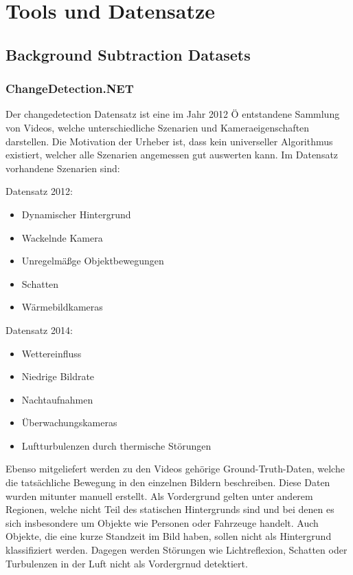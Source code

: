 \chapter{Tools und Datensatze}

\section{Background Subtraction Datasets}
\subsection*{ChangeDetection.NET}
Der changedetection Datensatz ist eine im Jahr 2012 Ö entstandene Sammlung von Videos, welche unterschiedliche Szenarien und Kameraeigenschaften darstellen. Die Motivation der Urheber ist, dass kein universeller Algorithmus existiert, welcher alle Szenarien angemessen gut auswerten kann. Im Datensatz vorhandene Szenarien sind:
\begin{multicols}{2}
Datensatz 2012:
\begin{itemize}
 \item Dynamischer Hintergrund
 \item Wackelnde Kamera
 \item Unregelm\"aßge Objektbewegungen
 \item Schatten
 \item W\"armebildkameras
\end{itemize}

\columnbreak

Datensatz 2014:
\begin{itemize}
 \item Wettereinfluss
 \item Niedrige Bildrate
 \item Nachtaufnahmen
 \item \"Uberwachungskameras
 \item Luftturbulenzen durch thermische St\"orungen
\end{itemize}
\end{multicols}

Ebenso mitgeliefert werden zu den Videos geh\"orige Ground-Truth-Daten, welche die tats\"achliche Bewegung in den einzelnen Bildern beschreiben. Diese Daten wurden mitunter manuell erstellt. Als Vordergrund gelten unter anderem Regionen, welche nicht Teil des statischen Hintergrunds sind und bei denen es sich insbesondere um Objekte wie Personen oder Fahrzeuge handelt. Auch Objekte, die eine kurze Standzeit im Bild haben, sollen nicht als Hintergrund klassifiziert werden. Dagegen werden St\"orungen wie Lichtreflexion, Schatten oder Turbulenzen in der Luft nicht als Vordergrnud detektiert. 


